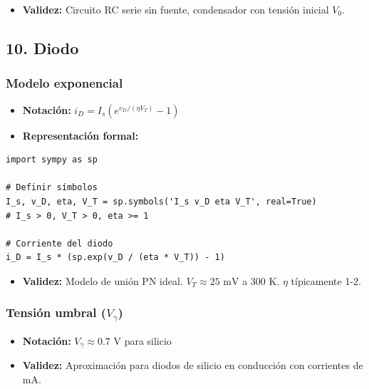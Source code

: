 \documentclass[11pt,a4paper]{article}
\begin{document}
\begin{itemize}[leftmargin=*,topsep=2pt,itemsep=1pt]
  \item \textbf{Validez:} Circuito RC serie sin fuente, condensador con tensión inicial $V_0$.
\end{itemize}


\subsection*{10. Diodo}


\subsubsection*{Modelo exponencial}


\begin{itemize}[leftmargin=*,topsep=2pt,itemsep=1pt]
  \item \textbf{Notación:} $i_D = I_s (e^{v_D / (\eta V_T)} - 1)$
  \item \textbf{Representación formal:}
\end{itemize}


\begin{lstlisting}
import sympy as sp

# Definir símbolos
I_s, v_D, eta, V_T = sp.symbols('I_s v_D eta V_T', real=True)
# I_s > 0, V_T > 0, eta >= 1

# Corriente del diodo
i_D = I_s * (sp.exp(v_D / (eta * V_T)) - 1)
\end{lstlisting}


\begin{itemize}[leftmargin=*,topsep=2pt,itemsep=1pt]
  \item \textbf{Validez:} Modelo de unión PN ideal. $V_T \approx 25\text{ mV}$ a 300 K. $\eta$ típicamente 1-2.
\end{itemize}


\subsubsection*{Tensión umbral ($V_\gamma$)}


\begin{itemize}[leftmargin=*,topsep=2pt,itemsep=1pt]
  \item \textbf{Notación:} $V_\gamma \approx 0.7\text{ V}$ para silicio
  \item \textbf{Validez:} Aproximación para diodos de silicio en conducción con corrientes de mA.
\end{itemize}
\end{document}

